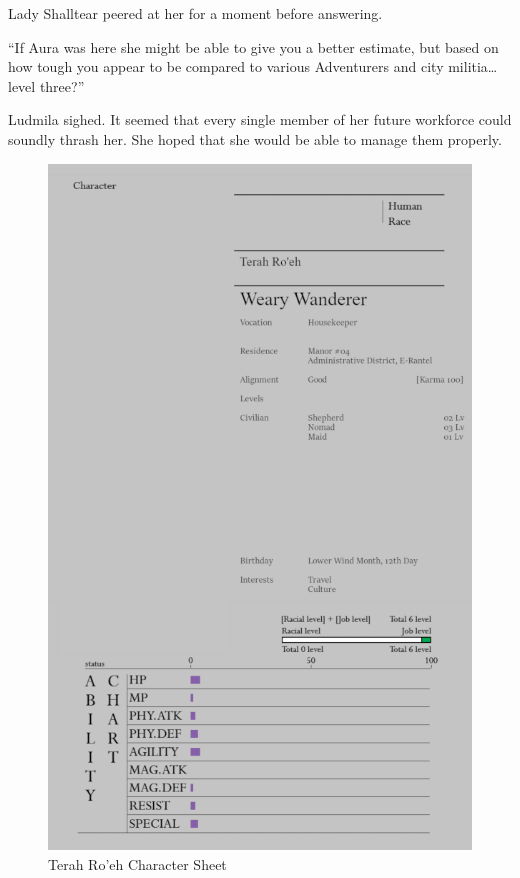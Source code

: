  

Lady Shalltear peered at her for a moment before answering.

 

“If Aura was here she might be able to give you a better estimate, but based on how tough you appear to be compared to various Adventurers and city militia…level three?”

 

Ludmila sighed. It seemed that every single member of her future workforce could soundly thrash her. She hoped that she would be able to manage them properly.

\begin{figure}
    \centering
    \includegraphics[width=1\linewidth]{V1 Birthright//images/8ugC7a1.png}
    \caption*{Terah Ro'eh Character Sheet}
\end{figure}


